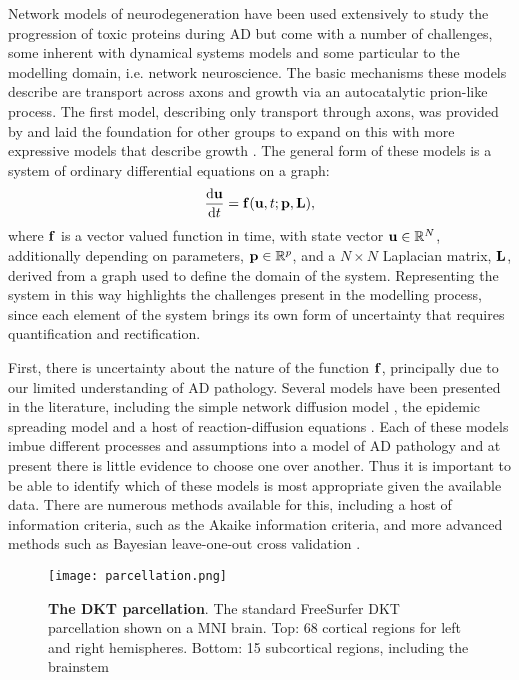 Network models of neurodegeneration have been used extensively to study the
progression of toxic proteins during AD but come with a number of challenges,
some inherent with dynamical systems models and some particular to the modelling
domain, i.e. network neuroscience.  The basic mechanisms these models describe
are transport across axons and growth via an autocatalytic prion-like process.
The first model, describing only transport through axons, was provided by
\cite{raj2012network} and laid the foundation for other groups to expand on this
with more expressive models that describe growth
\cite{fornari2019prion,fornari2020spatially,weickenmeier2018multiphysics}.  
The general form of these models is a system of ordinary differential equations
on a graph: 
\begin{equation}\label{equ:general-system}
\dfrac{\mathrm{d}\mathbf{u}}{\mathrm{d}t} = \mathbf{f}(\mathbf{u},  t; \mathbf{p}, \mathbf{L}),
\end{equation}
where $\mathbf{f}$ is a vector valued function in time, with state vector $\mathbf{u}
\in \mathbb{R}^N$, additionally depending on parameters, $\mathbf{p} \in
\mathbb{R}^p$, and a $N \times N$ Laplacian matrix, $\mathbf{L}$, derived from a
graph used to define the domain of the system. Representing the system in this
way highlights the challenges present in the modelling process, since each
element of the system brings its own form of uncertainty that requires
quantification and rectification. 

First, there is uncertainty about the nature of the function $\mathbf{f}$,
principally due to our limited understanding of AD pathology. Several models
have been presented in the literature, including the simple network diffusion
model \cite{raj2012network,raj2015network}, the epidemic spreading model
\cite{vogel2020spread} and a host of reaction-diffusion equations
\cite{fornari2019prion,fornari2020spatially}. Each of these models imbue
different processes and assumptions into a model of AD pathology and at present
there is little evidence to choose one over another. Thus it is important to  be
able to identify which of these models is most appropriate given the available
data. There are numerous methods available for this, including a host of
information criteria, such as the Akaike information criteria, and more advanced
methods such as Bayesian leave-one-out cross validation
\cite{gelman2014understanding}.

\begin{figure}[t]
    \texttt{[image: parcellation.png]}
    \centering
    \caption{\textbf{The DKT parcellation}. The standard FreeSurfer DKT
    parcellation shown on a MNI brain. Top: 68 cortical regions for left and
    right hemispheres. Bottom: 15 subcortical regions, including the brainstem}
    \label{fig:parcellation}
\end{figure}

